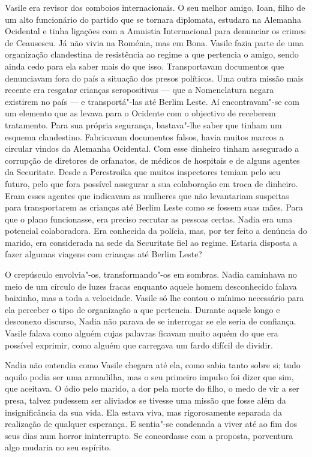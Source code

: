 Vasile era revisor dos comboios internacionais. O seu melhor amigo,
Ioan, filho de um alto funcionário do partido que se tornara
diplomata, estudara na Alemanha Ocidental e tinha ligações com a
Amnistia Internacional para denunciar os crimes de Ceausescu. Já não
vivia na Roménia, mas em Bona. Vasile fazia parte de uma organização
clandestina de resistência ao regime a que pertencia o amigo, sendo
ainda cedo para ela saber mais do que isso. Transportavam documentos que
denunciavam fora do país a situação dos presos políticos. Uma outra
missão mais recente era resgatar crianças seropositivas --- que a
Nomenclatura negara existirem no país --- e transportá"-las até Berlim
Leste. Aí encontravam"-se com um elemento que as levava para o Ocidente
com o objectivo de receberem tratamento. Para sua própria segurança,
bastava"-lhe saber que tinham um esquema clandestino. Fabricavam documentos falsos, havia muitos marcos a circular vindos da Alemanha
Ocidental. Com esse dinheiro tinham assegurado a corrupção de
diretores de orfanatos, de médicos de hospitais e de alguns agentes da
Securitate. Desde a Perestroika que muitos inspectores temiam pelo seu
futuro,
pelo que fora possível assegurar a sua colaboração em troca de dinheiro.
Eram esses agentes que indicavam as mulheres que não levantariam
suspeitas para transportarem as crianças até Berlim Leste como se
fossem suas mães. Para que o plano funcionasse, era preciso recrutar as
pessoas certas. Nadia era uma potencial colaboradora. Era conhecida da
polícia, mas, por ter feito a denúncia do marido, era considerada na
sede da Securitate fiel ao regime. Estaria disposta a fazer algumas
viagens com crianças até Berlim Leste?

O crepúsculo envolvia"-os, transformando"-os em sombras. Nadia caminhava
no meio de um círculo de luzes fracas enquanto aquele homem desconhecido
falava baixinho, mas a toda a velocidade. Vasile só lhe contou o mínimo
necessário para ela perceber o tipo de organização a que pertencia.
Durante aquele longo e desconexo discurso, Nadia não parava de se
interrogar se ele seria de confiança. Vasile falava como alguém cujas
palavras ficavam muito aquém do que era possível exprimir, como alguém
que carregava um fardo difícil de dividir.

Nadia não entendia como
Vasile chegara até ela, como sabia tanto sobre si; tudo aquilo podia ser
uma armadilha, mas o seu primeiro impulso foi dizer que sim, que
aceitava. O ódio pelo marido, a dor pela morte do filho, o medo de vir a
ser presa, talvez pudessem ser aliviados se tivesse uma missão que fosse
além da insignificância da sua vida. Ela estava viva, mas rigorosamente
separada da realização de qualquer esperança. E sentia"-se condenada a
viver até ao fim dos seus dias num horror ininterrupto. Se concordasse
com a proposta, porventura algo mudaria no seu espírito.


